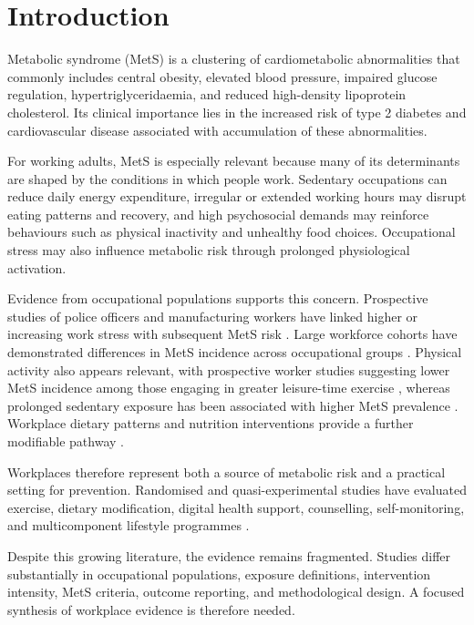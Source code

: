 \documentclass[11pt]{article}
\begin{document}
\section{Introduction}

Metabolic syndrome (MetS) is a clustering of cardiometabolic abnormalities that commonly includes central obesity, elevated blood pressure, impaired glucose regulation, hypertriglyceridaemia, and reduced high-density lipoprotein cholesterol. Its clinical importance lies in the increased risk of type 2 diabetes and cardiovascular disease associated with accumulation of these abnormalities.

For working adults, MetS is especially relevant because many of its determinants are shaped by the conditions in which people work. Sedentary occupations can reduce daily energy expenditure, irregular or extended working hours may disrupt eating patterns and recovery, and high psychosocial demands may reinforce behaviours such as physical inactivity and unhealthy food choices. Occupational stress may also influence metabolic risk through prolonged physiological activation.

Evidence from occupational populations supports this concern. Prospective studies of police officers and manufacturing workers have linked higher or increasing work stress with subsequent MetS risk \citep{Garbarino2015,Yamaguchi2018}. Large workforce cohorts have demonstrated differences in MetS incidence across occupational groups \citep{vanZon2020Occupational,Runge2021Metabolic}. Physical activity also appears relevant, with prospective worker studies suggesting lower MetS incidence among those engaging in greater leisure-time exercise \citep{Kuwahara2016}, whereas prolonged sedentary exposure has been associated with higher MetS prevalence \citep{Motuma2020}. Workplace dietary patterns and nutrition interventions provide a further modifiable pathway \citep{Kim2016Dietary,Ma2025}.

Workplaces therefore represent both a source of metabolic risk and a practical setting for prevention. Randomised and quasi-experimental studies have evaluated exercise, dietary modification, digital health support, counselling, self-monitoring, and multicomponent lifestyle programmes \citep{Haufe2019,Choi2017,Ryu2017,So2025,Bogale2025}.

Despite this growing literature, the evidence remains fragmented. Studies differ substantially in occupational populations, exposure definitions, intervention intensity, MetS criteria, outcome reporting, and methodological design. A focused synthesis of workplace evidence is therefore needed.
\end{document}
